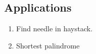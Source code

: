 \subsection{Applications}
\begin{enumerate}
\item Find needle in haystack. 
\item Shortest palindrome 
\end{enumerate}

